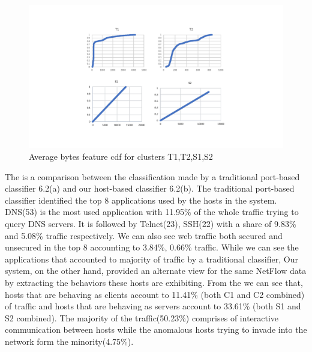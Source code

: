 \begin{figure}[t]
	\centerline{\includegraphics[trim=2cm 2cm 2cm 2cm, scale = 0.7]{bytes_cdf.pdf}}
	\caption{ Average bytes feature cdf for clusters T1,T2,S1,S2}%
\end{figure}

The  is a comparison between the classification made by a traditional port-based classifier 6.2(a) and our host-based classifier 6.2(b). The traditional port-based classifier identified the top 8 applications used by the hosts in the system. DNS(53) is the most used application with 11.95\% of the whole traffic trying to query DNS servers. It is followed by Telnet(23), SSH(22) with a share of 9.83\% and 5.08\% traffic respectively. We can also see web traffic both secured and unsecured in the top 8 accounting to 3.84\%, 0.66\% traffic. While we can see the applications that accounted to majority of traffic by a traditional classifier, Our system, on the other hand, provided an alternate view for the same NetFlow data by extracting the behaviors these hosts are exhibiting. From the  we can see that, hosts that are behaving as clients account to 11.41\% (both C1 and C2 combined) of traffic and hosts that are behaving as servers account to 33.61\% (both S1 and S2 combined). The majority of the traffic(50.23\%) comprises of interactive communication between hosts while the anomalous hosts trying to invade into the network form the minority(4.75\%). 


